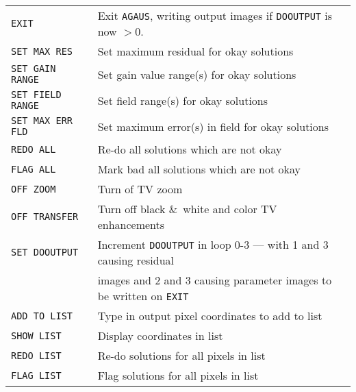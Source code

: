 \documentclass[twoside]{article}
\begin{document}
\begin{center}
\begin{tabular}{|l|l|}\hline
 {\tt EXIT           } & Exit {\tt AGAUS}, writing output images if
                         {\tt DOOUTPUT} is now $> 0.$\\
 {\tt SET MAX RES    } & Set maximum residual for okay solutions\\
 {\tt SET GAIN RANGE } & Set gain value range(s) for okay solutions\\
 {\tt SET FIELD RANGE } & Set field range(s) for okay solutions\\
 {\tt SET MAX ERR FLD} & Set maximum error(s) in field for okay
                         solutions\\
 {\tt REDO ALL       } & Re-do all solutions which are not okay\\
 {\tt FLAG ALL       } & Mark bad all solutions which are not okay\\
 {\tt OFF ZOOM       } & Turn of TV zoom\\
 {\tt OFF TRANSFER   } & Turn off black \&\ white and color TV
                         enhancements\\
 {\tt SET DOOUTPUT   } & Increment {\tt DOOUTPUT} in loop 0-3 --- with
                         1 and 3 causing residual\\
                       & images and 2 and 3 causing parameter images
                         to be written on {\tt EXIT}\\
 {\tt ADD TO LIST    } & Type in output pixel coordinates to add to
                         list\\
 {\tt SHOW LIST      } & Display coordinates in list\\
 {\tt REDO LIST      } & Re-do solutions for all pixels in list\\
 {\tt FLAG LIST      } & Flag solutions for all pixels in list\\ \hline
\end{tabular}
\end{center}
\end{document}
